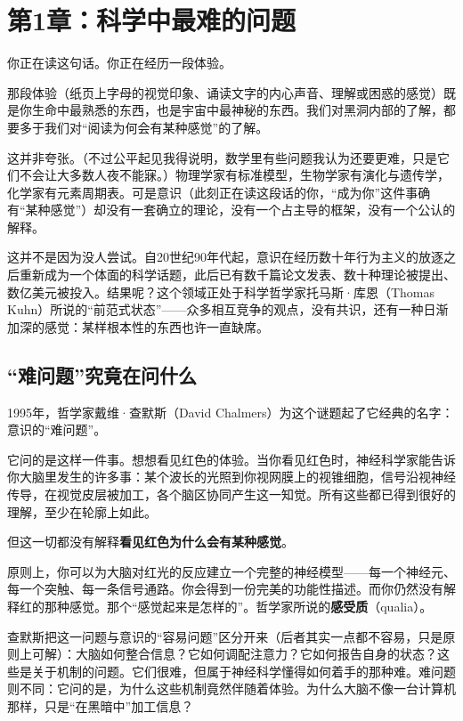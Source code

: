 \documentclass[11pt, twoside, openright]{book}
\begin{document}
\mainmatter
\pagestyle{fancy}
\chapter*{第1章：科学中最难的问题}

你正在读这句话。你正在经历一段体验。

那段体验（纸页上字母的视觉印象、诵读文字的内心声音、理解或困惑的感觉）既是你生命中最熟悉的东西，也是宇宙中最神秘的东西。我们对黑洞内部的了解，都要多于我们对“阅读为何会有某种感觉”的了解。

这并非夸张。（不过公平起见我得说明，数学里有些问题我认为还要更难，只是它们不会让大多数人夜不能寐。）物理学家有标准模型，生物学家有演化与遗传学，化学家有元素周期表。可是意识（此刻正在读这段话的你，“成为你”这件事确有“某种感觉”）却没有一套确立的理论，没有一个占主导的框架，没有一个公认的解释。

这并不是因为没人尝试。自20世纪90年代起，意识在经历数十年行为主义的放逐之后重新成为一个体面的科学话题，此后已有数千篇论文发表、数十种理论被提出、数亿美元被投入。结果呢？这个领域正处于科学哲学家托马斯·库恩（Thomas Kuhn）所说的“前范式状态”------众多相互竞争的观点，没有共识，还有一种日渐加深的感觉：某样根本性的东西也许一直缺席。

\section*{“难问题”究竟在问什么}

1995年，哲学家戴维·查默斯（David Chalmers）为这个谜题起了它经典的名字：意识的“难问题”。

它问的是这样一件事。想想看见红色的体验。当你看见红色时，神经科学家能告诉你大脑里发生的许多事：某个波长的光照到你视网膜上的视锥细胞，信号沿视神经传导，在视觉皮层被加工，各个脑区协同产生这一知觉。所有这些都已得到很好的理解，至少在轮廓上如此。

但这一切都没有解释\textbf{看见红色为什么会有某种感觉}。

原则上，你可以为大脑对红光的反应建立一个完整的神经模型------每一个神经元、每一个突触、每一条信号通路。你会得到一份完美的功能性描述。而你仍然没有解释红的那种感觉。那个“感觉起来是怎样的”。哲学家所说的\textbf{感受质}（qualia）。

查默斯把这一问题与意识的“容易问题”区分开来（后者其实一点都不容易，只是原则上可解）：大脑如何整合信息？它如何调配注意力？它如何报告自身的状态？这些是关于机制的问题。它们很难，但属于神经科学懂得如何着手的那种难。难问题则不同：它问的是，为什么这些机制竟然伴随着体验。为什么大脑不像一台计算机那样，只是“在黑暗中”加工信息？
\end{document}
